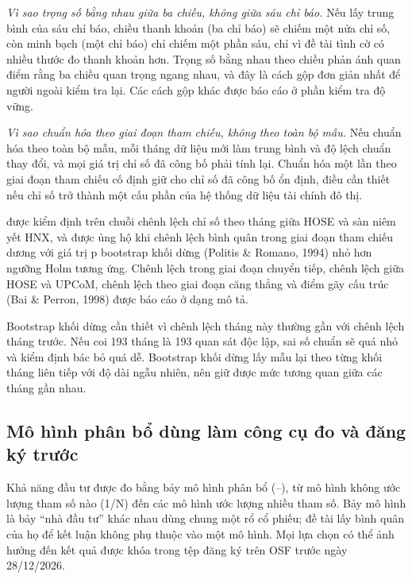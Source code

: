 \begin{vidao}
\emph{Vì sao trọng số bằng nhau giữa ba chiều, không giữa sáu chỉ báo.} Nếu lấy trung bình của sáu chỉ báo, chiều thanh khoản (ba chỉ báo) sẽ chiếm một nửa chỉ số, còn minh bạch (một chỉ báo) chỉ chiếm một phần sáu, chỉ vì đề tài tình cờ có nhiều thước đo thanh khoản hơn. Trọng số bằng nhau theo chiều phản ánh quan điểm rằng ba chiều quan trọng ngang nhau, và đây là cách gộp đơn giản nhất để người ngoài kiểm tra lại. Các cách gộp khác được báo cáo ở phần kiểm tra độ vững.
\end{vidao}

\begin{vidao}
\emph{Vì sao chuẩn hóa theo giai đoạn tham chiếu, không theo toàn bộ mẫu.} Nếu chuẩn hóa theo toàn bộ mẫu, mỗi tháng dữ liệu mới làm trung bình và độ lệch chuẩn thay đổi, và mọi giá trị chỉ số đã công bố phải tính lại. Chuẩn hóa một lần theo giai đoạn tham chiếu cố định giữ cho chỉ số đã công bố ổn định, điều cần thiết nếu chỉ số trở thành một cấu phần của hệ thống dữ liệu tài chính đô thị.
\end{vidao}

 được kiểm định trên chuỗi chênh lệch chỉ số theo tháng giữa HOSE và sàn niêm yết HNX, và được ủng hộ khi chênh lệch bình quân trong giai đoạn tham chiếu dương với giá trị p bootstrap khối dừng (Politis \& Romano, 1994) nhỏ hơn ngưỡng Holm tương ứng. Chênh lệch trong giai đoạn chuyển tiếp, chênh lệch giữa HOSE và UPCoM, chênh lệch theo giai đoạn căng thẳng và điểm gãy cấu trúc (Bai \& Perron, 1998) được báo cáo ở dạng mô tả.

Bootstrap khối dừng cần thiết vì chênh lệch tháng này thường gần với chênh lệch tháng trước. Nếu coi 193 tháng là 193 quan sát độc lập, sai số chuẩn sẽ quá nhỏ và kiểm định bác bỏ quá dễ. Bootstrap khối dừng lấy mẫu lại theo từng khối tháng liên tiếp với độ dài ngẫu nhiên, nên giữ được mức tương quan giữa các tháng gần nhau.

\subsection{Mô hình phân bổ dùng làm công cụ đo và đăng ký trước}\label{sec:mohinh}

\begin{tomtat}
Khả năng đầu tư được đo bằng bảy mô hình phân bổ (--), từ mô hình không ước lượng tham số nào (1/N) đến các mô hình ước lượng nhiều tham số. Bảy mô hình là bảy \enquote{nhà đầu tư} khác nhau dùng chung một rổ cổ phiếu; đề tài lấy bình quân của họ để kết luận không phụ thuộc vào một mô hình. Mọi lựa chọn có thể ảnh hưởng đến kết quả được khóa trong tệp đăng ký trên OSF trước ngày 28/12/2026.
\end{tomtat}

